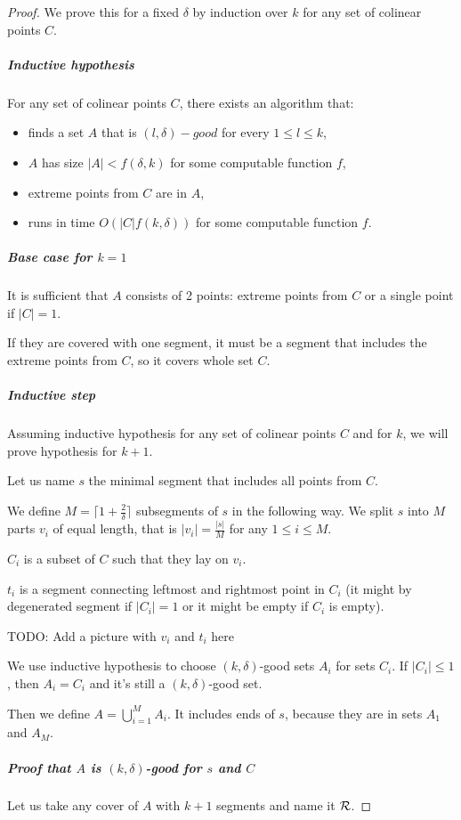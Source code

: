 \begin{proof}
We prove this for a fixed $\delta$
by induction over $k$ for any set of colinear points $C$.

\subparagraph{Inductive hypothesis}
For any set of colinear points $C$,
there exists an algorithm that:
\begin{itemize}
\item finds a set $A$ that is $(l, \delta)-good$ for every $1 \le l \le k$,
\item $A$ has size $|A| < f(\delta, k)$ for some computable function $f$,
\item extreme points from $C$ are in $A$,
\item runs in time $O(|C| f(k, \delta))$ for some computable function $f$.
\end{itemize}

\subparagraph{Base case for $k = 1$}
It is sufficient that $A$ consists of 2 points: extreme points from $C$
or a single point if $|C| = 1$.

If they are covered with one segment, it must be a segment 
that includes the extreme points from $C$, so it covers whole set $C$.

\subparagraph{Inductive step}
Assuming inductive hypothesis for any set of colinear points $C$
and for $k$, we will prove hypothesis for $k+1$.

Let us name $s$ the minimal segment that includes all points from $C$.

We define $M = \lceil1+\frac{2}{\delta}\rceil$ subsegments of $s$ in the following way.
We split $s$ into $M$ parts 
$v_i$ of equal length, that is $|v_i| = \frac{|s|}{M}$ for any $1 \le i \le M$.

$C_i$ is a subset of $C$ such that they lay on $v_i$.

$t_i$ is a segment connecting leftmost and rightmost point in $C_i$
(it might by degenerated segment if $|C_i| = 1$ or it might be empty
if $C_i$ is empty).

TODO: Add a picture with $v_i$ and $t_i$ here

We use inductive hypothesis to choose $(k, \delta)$-good sets $A_i$
for sets $C_i$. If $|C_i| \le 1$, then $A_i = C_i$
and it's still a $(k, \delta)$-good set.

Then we define $A = \bigcup_{i=1}^{M} A_i$.
It includes ends of $s$, because they are in sets $A_1$ and $A_M$.

\subparagraph{Proof that $A$ is $(k, \delta)$-good for $s$ and $C$}
Let us take any cover of $A$ with $k+1$ segments and name it $\mathcal{R}$.


\end{proof}
